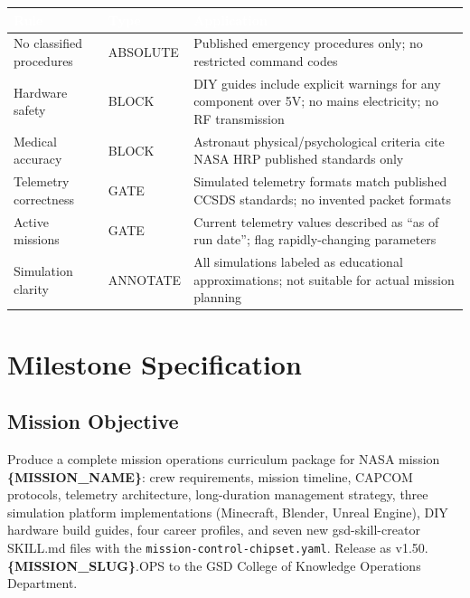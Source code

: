 \documentclass[11pt,letterpaper]{article}
\newcommand{\stageheader}[2]{%
  \noindent\colorbox{#2}{\makebox[\textwidth][l]{%
    \textcolor{white}{\bfseries\sffamily\hspace{6pt}#1\hspace{6pt}}}}%
  \vspace{0.5em}\par%
}
\newcommand{\param}[1]{\textcolor{paramred}{\textbf{\{#1\}}}}
\newcommand{\tableheader}[1]{\textbf{\sffamily\textcolor{white}{#1}}}
\begin{document}
\begin{center}
\begin{tabularx}{\textwidth}{L{3cm}L{2cm}X}
\toprule
{}
\tableheader{Rule} & \tableheader{Type} & \tableheader{Application} \\
\midrule
No classified procedures & ABSOLUTE & Published emergency procedures only; no restricted command codes \\
Hardware safety & BLOCK & DIY guides include explicit warnings for any component over 5V; no mains electricity; no RF transmission \\
Medical accuracy & BLOCK & Astronaut physical/psychological criteria cite NASA HRP published standards only \\
Telemetry correctness & GATE & Simulated telemetry formats match published CCSDS standards; no invented packet formats \\
Active missions & GATE & Current telemetry values described as ``as of run date''; flag rapidly-changing parameters \\
Simulation clarity & ANNOTATE & All simulations labeled as educational approximations; not suitable for actual mission planning \\
\bottomrule
\end{tabularx}
\end{center}

\newpage

\stageheader{STAGE 3 --- MISSION PACKAGE}{tertiary}

\section{Milestone Specification}

\subsection{Mission Objective}

Produce a complete mission operations curriculum package for NASA mission \param{MISSION\_NAME}: crew requirements, mission timeline, CAPCOM protocols, telemetry architecture, long-duration management strategy, three simulation platform implementations (Minecraft, Blender, Unreal Engine), DIY hardware build guides, four career profiles, and seven new gsd-skill-creator SKILL.md files with the \texttt{mission-control-chipset.yaml}. Release as v1.50.\param{MISSION\_SLUG}.OPS to the GSD College of Knowledge Operations Department.
\end{document}
